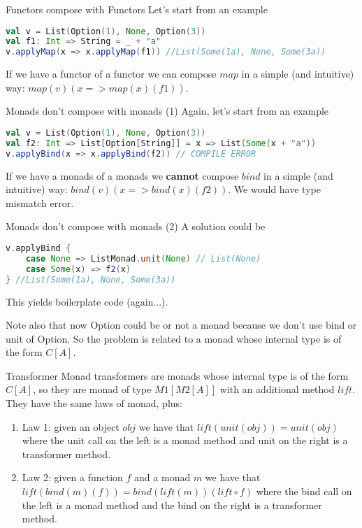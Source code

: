 \begin{frame}[fragile]{Functors compose with Functors}
	Let's start from an example
\begin{lstlisting}[language=scala]
val v = List(Option(1), None, Option(3))
val f1: Int => String = _ + "a"
v.applyMap(x => x.applyMap(f1)) //List(Some(1a), None, Some(3a))
\end{lstlisting}
	If we have a functor of a functor we can compose $map$ in a simple (and intuitive) way: $map(v)(x => map(x)(f1))$.
\end{frame}

\begin{frame}[fragile]{Monads don't compose with monads (1)}
	Again, let's start from an example
\begin{lstlisting}[language=scala]
val v = List(Option(1), None, Option(3))
val f2: Int => List[Option[String]] = x => List(Some(x + "a"))
v.applyBind(x => x.applyBind(f2)) // COMPILE ERROR
\end{lstlisting}
	If we have a monads of a monads we \textbf{cannot} compose $bind$ in a simple (and intuitive) way: $bind(v)(x => bind(x)(f2))$.
	We would have type mismatch error. 	
\end{frame}

\begin{frame}[fragile]{Monads don't compose with monads (2)}	
	A solution could be
\begin{lstlisting}[language=scala]
v.applyBind {
	case None => ListMonad.unit(None) // List(None)
	case Some(x) => f2(x)
} //List(Some(1a), None, Some(3a))
\end{lstlisting}	
	This yields boilerplate code (again...).

	Note also that now Option could be or not a monad because we don't use bind or unit of Option. 
	So the problem is related to a monad whose internal type is of the form $C[A]$.
\end{frame}

\begin{frame}[fragile]{Transformer}
	Monad transformers are monads whose internal type is of the form $C[A]$, 
	so they are monad of type $M1[M2[A]]$ with an additional method $lift$.
	\pause 
	They have the same laws of monad, plus:
	\begin{enumerate}[<+->]
        \item Law 1: given an object $obj$ we have that
			$lift(unit(obj)) = unit(obj)$ where the unit call on the left is
          	a monad method and unit on the right is a transformer
          	method.
		\item Law 2: given a function $f$ and a monad $m$ we have that $lift(bind(m)(f)) = bind(lift(m))(lift \circ f)$ where the
			bind call on the left is a monad method and the
			bind on the right is a transformer method.
	\end{enumerate}
\end{frame}

